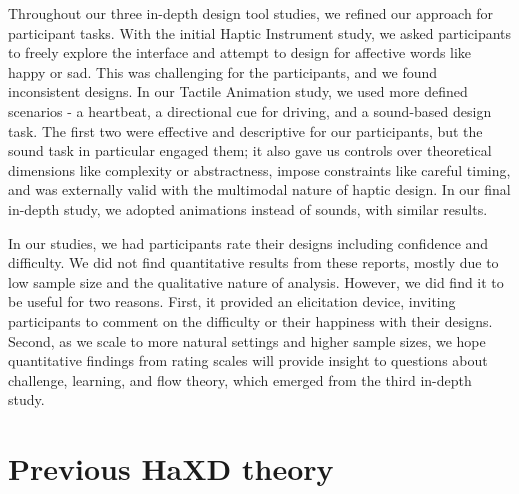 Throughout our three in-depth design tool studies, we refined our approach for participant tasks.
With the initial Haptic Instrument study, we asked participants to freely explore the interface and attempt to design for affective words like happy or sad.
This was challenging for the participants, and we found inconsistent designs. 
In our Tactile Animation study, we used more defined scenarios - a heartbeat, a directional cue for driving, and a sound-based design task.
The first two were effective and descriptive for our participants, but the sound task in particular engaged them; it also gave us controls over theoretical dimensions like complexity or abstractness, impose constraints like careful timing, and was externally valid with the multimodal nature of haptic design.
In our final in-depth study, we adopted animations instead of sounds, with similar results.

In our studies, we had participants rate their designs including confidence and difficulty.
We did not find quantitative results from these reports, mostly due to low sample size and the qualitative nature of analysis.
However, we did find it to be useful for two reasons.
First, it provided an elicitation device, inviting participants to comment on the difficulty or their happiness with their designs.
Second, as we scale to more natural settings and higher sample sizes, we hope quantitative findings from rating scales will provide insight to questions about challenge, learning, and flow theory, which emerged from the third in-depth study.



\section{Previous HaXD theory}


